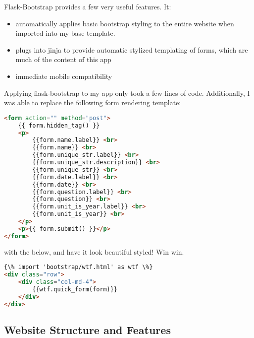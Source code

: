 \documentclass[12pt] {article}
\begin{document}
Flask-Bootstrap provides a few very useful features. It: 
\begin{itemize}
    \item automatically applies basic bootstrap styling to the entire website when imported into my base template.
    \item plugs into jinja to provide automatic stylized templating of forms, which are much of the content of this app
    \item immediate mobile compatibility
\end{itemize}

Applying flask-bootstrap to my app only took a few lines of code. Additionally, I was able to replace the following form rendering template: 

\begin{lstlisting}[language=HTML, basicstyle=\small]
<form action="" method="post">
    {{ form.hidden_tag() }}
    <p>
        {{form.name.label}} <br>
        {{form.name}} <br>
        {{form.unique_str.label}} <br>
        {{form.unique_str.description}} <br>
        {{form.unique_str}} <br>
        {{form.date.label}} <br>
        {{form.date}} <br>
        {{form.question.label}} <br>
        {{form.question}} <br>
        {{form.unit_is_year.label}} <br>
        {{form.unit_is_year}} <br>
    </p>
    <p>{{ form.submit() }}</p>
</form>
\end{lstlisting}

with the below, and have it look beautiful styled! Win win.

\begin{lstlisting}[language=HTML, basicstyle=\small]
{\% import 'bootstrap/wtf.html' as wtf \%}
<div class="row">
    <div class="col-md-4">
        {{wtf.quick_form(form)}}
    </div>
</div>
\end{lstlisting}


\subsection{Website Structure and Features}
\end{document}
